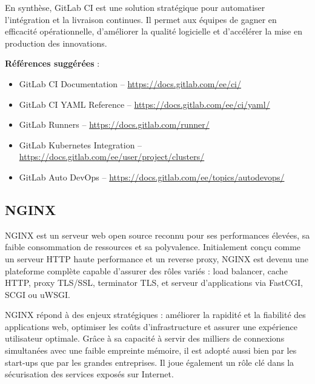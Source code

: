 En synthèse, GitLab CI est une solution stratégique pour automatiser l’intégration et la livraison continues. Il permet aux équipes de gagner en efficacité opérationnelle, d’améliorer la qualité logicielle et d’accélérer la mise en production des innovations.

\textbf{Références suggérées} :
\begin{itemize}
	\item GitLab CI Documentation – \url{https://docs.gitlab.com/ee/ci/}
	\item GitLab CI YAML Reference – \url{https://docs.gitlab.com/ee/ci/yaml/}
	\item GitLab Runners – \url{https://docs.gitlab.com/runner/}
	\item GitLab Kubernetes Integration – \url{https://docs.gitlab.com/ee/user/project/clusters/}
	\item GitLab Auto DevOps – \url{https://docs.gitlab.com/ee/topics/autodevops/}
\end{itemize}

\subsection{NGINX}

NGINX est un serveur web open source reconnu pour ses performances élevées, sa faible consommation de ressources et sa polyvalence. Initialement conçu comme un serveur HTTP haute performance et un reverse proxy, NGINX est devenu une plateforme complète capable d’assurer des rôles variés  : load balancer, cache HTTP, proxy TLS/SSL, terminator TLS, et serveur d’applications via FastCGI, SCGI ou uWSGI.

 NGINX répond à des enjeux stratégiques  : améliorer la rapidité et la fiabilité des applications web, optimiser les coûts d’infrastructure et assurer une expérience utilisateur optimale. Grâce à sa capacité à servir des milliers de connexions simultanées avec une faible empreinte mémoire, il est adopté aussi bien par les start-ups que par les grandes entreprises. Il joue également un rôle clé dans la sécurisation des services exposés sur Internet.

